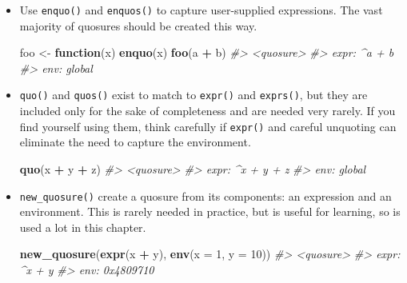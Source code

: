 \documentclass[]{book}
\makeatletter
\newenvironment{Shaded}{\begin{snugshade}}{\end{snugshade}}
\newcommand{\CommentTok}[1]{\textcolor[rgb]{0.37,0.37,0.37}{\textit{#1}}}
\newcommand{\ControlFlowTok}[1]{\textcolor[rgb]{0.27,0.27,0.27}{\textbf{#1}}}
\newcommand{\DataTypeTok}[1]{\textcolor[rgb]{0.27,0.27,0.27}{#1}}
\newcommand{\DecValTok}[1]{\textcolor[rgb]{0.06,0.06,0.06}{#1}}
\newcommand{\KeywordTok}[1]{\textcolor[rgb]{0.27,0.27,0.27}{\textbf{#1}}}
\newcommand{\NormalTok}[1]{#1}
\newcommand{\OperatorTok}[1]{\textcolor[rgb]{0.43,0.43,0.43}{\textbf{#1}}}
\newcommand{\StringTok}[1]{\textcolor[rgb]{0.5,0.5,0.5}{#1}}
\newcommand{\indexc}[1]{\index{#1@\texttt{#1}}}
\makeatother
\begin{document}
\begin{itemize}
\item
  Use \texttt{enquo()} and \texttt{enquos()} to capture user-supplied expressions.
  The vast majority of quosures should be created this way.

\begin{Shaded}
\begin{Highlighting}[]
\NormalTok{foo <-}\StringTok{ }\ControlFlowTok{function}\NormalTok{(x) }\KeywordTok{enquo}\NormalTok{(x)}
\KeywordTok{foo}\NormalTok{(a }\OperatorTok{+}\StringTok{ }\NormalTok{b)}
\CommentTok{#> <quosure>}
\CommentTok{#> expr: ^a + b}
\CommentTok{#> env:  global}
\end{Highlighting}
\end{Shaded}

  \indexc{enquo()}
\item
  \texttt{quo()} and \texttt{quos()} exist to match to \texttt{expr()} and \texttt{exprs()}, but
  they are included only for the sake of completeness and are needed very
  rarely. If you find yourself using them, think carefully if \texttt{expr()} and
  careful unquoting can eliminate the need to capture the environment.

\begin{Shaded}
\begin{Highlighting}[]
\KeywordTok{quo}\NormalTok{(x }\OperatorTok{+}\StringTok{ }\NormalTok{y }\OperatorTok{+}\StringTok{ }\NormalTok{z)}
\CommentTok{#> <quosure>}
\CommentTok{#> expr: ^x + y + z}
\CommentTok{#> env:  global}
\end{Highlighting}
\end{Shaded}

\item
  \texttt{new\_quosure()} create a quosure from its components: an expression and
  an environment. This is rarely needed in practice, but is useful for
  learning, so is used a lot in this chapter.

\begin{Shaded}
\begin{Highlighting}[]
\KeywordTok{new_quosure}\NormalTok{(}\KeywordTok{expr}\NormalTok{(x }\OperatorTok{+}\StringTok{ }\NormalTok{y), }\KeywordTok{env}\NormalTok{(}\DataTypeTok{x =} \DecValTok{1}\NormalTok{, }\DataTypeTok{y =} \DecValTok{10}\NormalTok{))}
\CommentTok{#> <quosure>}
\CommentTok{#> expr: ^x + y}
\CommentTok{#> env:  0x4809710}
\end{Highlighting}
\end{Shaded}
\end{itemize}
\end{document}
